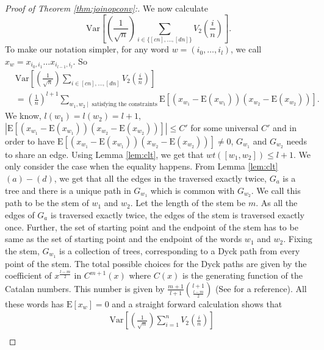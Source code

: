 \documentclass[reqno,12pt]{amsart}
\theoremstyle{plain}
\theoremstyle{definition}
\begin{document}
\begin{proof}[Proof of Theorem \ref{thm:joinopconv}:]
\noindent 
 We now calculate 
\[
\mathrm{Var}\left[\left( \frac{1}{\sqrt{n}} \right) \sum_{i \in \{[cn],\ldots,[dn]\} } V_{2}\left( \frac{i}{n} \right)\right].
\]
To make our notation simpler, for any word $w=(i_{0},\ldots,i_{l})$, we call $x_{w}= x_{i_{0},i_{1}}\ldots x_{i_{l-1},i_{l}}$. So 
\begin{equation}
    \begin{split}
       &\mathrm{Var}\left[ \left( \frac{1}{\sqrt{n}} \right) \sum_{i \in [cn],\ldots, [dn]  } V_{2}\left( \frac{i}{n} \right)\right]\\
       &= \left(\frac{1}{n}\right)^{l+1} \sum_{w_{1}, w_{2} ~|~ \text{ satisfying the constraints}} \mathrm{E}\left[ (x_{w_{1}}-\mathrm{E}(x_{w_{1}}))(x_{w_{2}}-\mathrm{E}(x_{w_{2}})) \right].
    \end{split}
\end{equation}
We know, $l(w_{1})=l(w_{2})=l+1$, $\left|\mathrm{E}\left[ (x_{w_{1}}-\mathrm{E}(x_{w_{1}}))(x_{w_{2}}-\mathrm{E}(x_{w_{2}})) \right]\right|\le C'$ for some universal $C'$ and in order to have $\mathrm{E}\left[ (x_{w_{1}}-\mathrm{E}(x_{w_{1}}))(x_{w_{2}}-\mathrm{E}(x_{w_{2}})) \right] \neq 0$, $G_{w_{1}}$ and $G_{w_{2}}$ needs to share an edge. Using Lemma \ref{lem:clt}, we get that $wt([w_{1},w_{2}])\le l+1$. We only consider the case when the equality happens. From Lemma \ref{lem:clt} $(a)-(d)$, we get that all the edges in the traversed exactly twice, $G_{a}$ is a tree and there is a unique path in $G_{w_{1}}$ which is common with $G_{w_{2}}$. We call this path to be the stem of $w_{1}$ and $w_{2}$. Let the length of the stem be $m$. As all the edges of $G_a$ is traversed exactly twice, the edges of the stem is traversed exactly once. Further, the set of starting point and the endpoint of the stem has to be same as the set of starting point and the endpoint of the words $w_{1}$ and $w_{2}$. Fixing the stem, $G_{w_{1}}$ is a collection of trees, corresponding to a Dyck path from every point of the stem. The total possible choices for the Dyck paths are given by the coefficient of $x^{\frac{l-m}{2}}$ in $C^{m+1}(x)$ where $C(x)$ is the generating function of the Catalan numbers. This number is given by $\frac{m+1}{l+1}\binom{l+1}{\frac{l-m}{2}}$ (See \cite{Lang} for a reference). All these words has $\mathrm{E}[x_{w}]=0$ and a straight forward calculation shows that
\begin{equation}
\begin{split}
    &\mathrm{Var}\left[ \left( \frac{1}{\sqrt{n}} \right)\sum_{i=1}^{n} V_{2}\left( \frac{i}{n} \right)\right]\\

\end{split}
\end{equation}
\end{proof}
\end{document}
